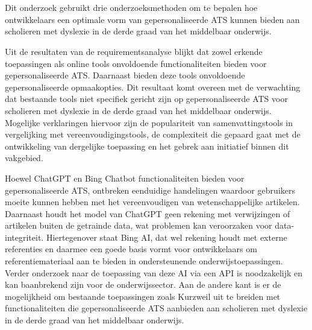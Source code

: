 
\chapter{}%
\label{ch:discussie}

Dit onderzoek gebruikt drie onderzoeksmethoden om te bepalen hoe ontwikkelaars een optimale vorm van gepersonaliseerde ATS kunnen bieden aan scholieren met dyslexie in de derde graad van het middelbaar onderwijs.

\medspace

Uit de resultaten van de requirementsanalyse blijkt dat zowel erkende toepassingen als online tools onvoldoende functionaliteiten bieden voor gepersonaliseerde ATS. Daarnaast bieden deze tools onvoldoende gepersonaliseerde opmaakopties. Dit resultaat komt overeen met de verwachting dat bestaande tools niet specifiek gericht zijn op gepersonaliseerde ATS voor scholieren met dyslexie in de derde graad van het middelbaar onderwijs. Mogelijke verklaringen hiervoor zijn de populariteit van samenvattingstools in vergelijking met vereenvoudigingstools, de complexiteit die gepaard gaat met de ontwikkeling van dergelijke toepassing en het gebrek aan initiatief binnen dit vakgebied.

\medspace

Hoewel ChatGPT en Bing Chatbot functionaliteiten bieden voor gepersonaliseerde ATS, ontbreken eenduidige handelingen waardoor gebruikers moeite kunnen hebben met het vereenvoudigen van wetenschappelijke artikelen. Daarnaast houdt het model van ChatGPT geen rekening met verwijzingen of artikelen buiten de getrainde data, wat problemen kan veroorzaken voor data-integriteit. Hiertegenover staat Bing AI, dat wel rekening houdt met externe referenties en daarmee een goede basis vormt voor ontwikkelaars om referentiemateriaal aan te bieden in ondersteunende onderwijstoepassingen. Verder onderzoek naar de toepassing van deze AI via een API is noodzakelijk en kan baanbrekend zijn voor de onderwijssector. Aan de andere kant is er de mogelijkheid om bestaande toepassingen zoals Kurzweil uit te breiden met functionaliteiten die gepersonaliseerde ATS aanbieden aan scholieren met dyslexie in de derde graad van het middelbaar onderwijs.

\medspace

